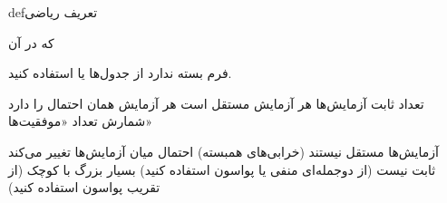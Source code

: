 \begin{PSbox}[unbreakable]{def}{تعریف ریاضی}


\end{PSbox}



که در آن 



فرم بسته ندارد  از جدول‌ها یا  استفاده کنید.






\lr{\mbox{\PSyes{}}} تعداد ثابت آزمایش‌ها \PSbr{}\lr{\mbox{\PSyes{}}} هر آزمایش مستقل است\PSbr{}\lr{\mbox{\PSyes{}}} هر آزمایش همان احتمال  را دارد\PSbr{}\lr{\mbox{\PSyes{}}} شمارش تعداد «موفقیت‌ها»


\lr{\mbox{\PSno{}}} آزمایش‌ها مستقل نیستند (خرابی‌های همبسته)\PSbr{}\lr{\mbox{\PSno{}}} احتمال میان آزمایش‌ها تغییر می‌کند\PSbr{} ثابت نیست (از دوجمله‌ای منفی یا پواسون استفاده کنید)\PSbr{} بسیار بزرگ با  کوچک (از تقریب پواسون استفاده کنید)



